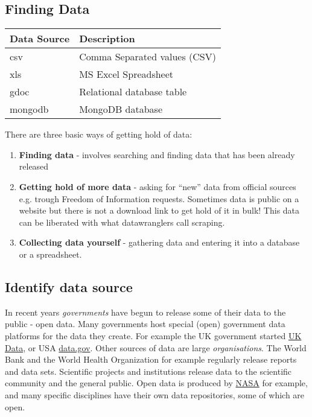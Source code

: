 \documentclass[letterpaper,12pt,oneside]{sphinxmanual}
\begin{document}
\subsection{Finding Data}
\label{introduction:finding-data}
\begin{tabulary}{\linewidth}{|L|L|}
\hline
\textsf{\relax 
\textbf{Data Source}
} & \textsf{\relax 
\textbf{Description}
}\\
\hline
csv
 & 
Comma Separated values (CSV)
\\
\hline
xls
 & 
MS Excel Spreadsheet
\\
\hline
gdoc
 & 
Relational database table
\\
\hline
mongodb
 & 
MongoDB database
\\
\hline\end{tabulary}


There are three basic ways of getting hold of data:
\begin{enumerate}
\item {} 
\textbf{Finding data} - involves searching and finding data that has been already released

\item {} 
\textbf{Getting hold of more data} - asking for “new” data from official sources e.g. trough
Freedom of Information requests. Sometimes data is public on a website but there is not
a download link to get hold of it in bulk! This data can be liberated with what
datawranglers call scraping.

\item {} 
\textbf{Collecting data yourself} - gathering data and entering it into a database or a
spreadsheet.

\end{enumerate}


\subsection{Identify data source}
\label{introduction:identify-data-source}
In recent years \emph{governments} have begun to release some of their data to the public - open data.
Many governments host special (open) government data platforms for the data they create.
For example the UK government started \href{https://www.ukdataservice.ac.uk}{UK Data}, or USA \href{http://www.data.gov}{data.gov}.
Other sources of data are large \emph{organisations}.
The World Bank and the World Health Organization for example regularly release reports and data sets.
Scientific projects and institutions release data to the scientific community and the general public.
Open data is produced by \href{https://www.nasa.gov}{NASA} for example, and many specific disciplines have their own data repositories, some of which are open.
\end{document}
